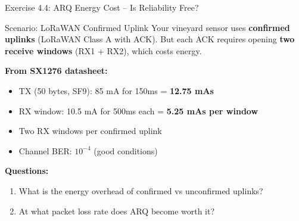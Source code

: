 \documentclass[aspectratio=169,11pt]{beamer}
\begin{document}
\begin{frame}{Exercise 4.4: ARQ Energy Cost -- Is Reliability Free?}
    \begin{block}{Scenario: LoRaWAN Confirmed Uplink}
        Your vineyard sensor uses \textbf{confirmed uplinks} (LoRaWAN Class A with ACK). But each ACK requires opening \textbf{two receive windows} (RX1 + RX2), which costs energy.
        
        \vspace{0.2cm}
        \textbf{From SX1276 datasheet:}
        \begin{itemize}
            \item TX (50 bytes, SF9): 85 mA for 150ms = \textbf{12.75 mAs}
            \item RX window: 10.5 mA for 500ms each = \textbf{5.25 mAs per window}
            \item Two RX windows per confirmed uplink
            \item Channel BER: $10^{-4}$ (good conditions)
        \end{itemize}
        
        \vspace{0.2cm}
        \textbf{Questions:}
        \begin{enumerate}
            \item What is the energy overhead of confirmed vs unconfirmed uplinks?
            \item At what packet loss rate does ARQ become worth it?
        \end{enumerate}
    \end{block}
\end{frame}
\end{document}
